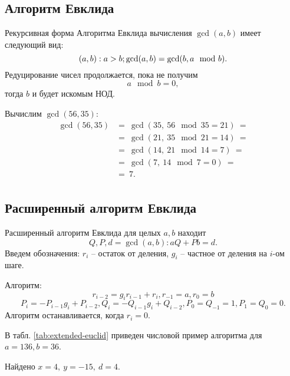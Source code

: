 \subsection{Алгоритм Евклида}

Рекурсивная форма Алгоритма Евклида вычисления $\gcd(a,b)$ имеет следующий вид:
    \[\mathbb{(}a,b): a>b;  \gcd(a,b) = \gcd(b, a \mod b). \]
Редуцирование чисел продолжается, пока не получим
    \[ a \mod b = 0, \]
тогда $b$ и будет искомым НОД.

\example
Вычислим $\gcd(56, 35)$:
\[ \begin{array}{ll}
    \gcd(56, 35) & =~ \gcd(35, ~ 56 \mod 35 = 21) ~= \\
    & =~ \gcd(21, ~ 35 \mod 21 = 14) ~= \\
    & =~ \gcd(14, ~ 21 \mod 14 = 7) ~= \\
    & =~ \gcd(7, ~ 14 \mod 7 = 0) ~= \\
    & =~ 7. \\
\end{array} \]
\exampleend


\subsection{Расширенный алгоритм Евклида}

Расширенный алгоритм Евклида для целых $a,b$ находит
    \[ Q, P, d = \gcd(a,b): aQ + Pb = d. \]
Введем обозначения: $r_i$ -- остаток от деления, $g_i$ -- частное от деления на $i$-ом шаге.

Алгоритм:
\[r_{i-2} = g_i r_{i-1}+r_i , r_{-1} = a, r_0 = b\]
\[P_i = -P_{i-1} g_i + P_{i-2}, Q_i = -Q_{i-1} g_i + Q_{i-2}, P_0 = Q_{-1} = 1, P_1 = Q_0 = 0.\]
Алгоритм останавливается, когда $r_i = 0$.


\example
В табл. \ref{tab:extended-euclid} приведен числовой пример алгоритма для $a=136, b=36$.
\begin{table}[!ht]
    \centering
    \caption{Пример расширенного алгоритма Евклида для \\ $a=136, b=36$\label{tab:extended-euclid}}
\end{table}
Найдено $x = 4, ~ y = -15, ~ d = 4$.
\exampleend

